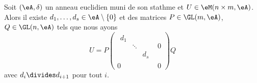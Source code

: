 \begin{proposition}   \label{PropPDfCqee}
	Soit \( (\eA,\delta)\) un anneau euclidien muni de son stathme  et \( U\in \eM(n \times m,\eA)\). Alors il existe \( d_1,\ldots, d_s\in \eA\setminus\{ 0 \}\) et des matrices \( P\in\GL(m,\eA)\), \( Q\in \GL(n,\eA)\) tels que nous ayons
	\begin{equation}
		U=P \begin{pmatrix}
			\begin{matrix}
				d_1 &        &     \\
				    & \ddots &     \\
				    &        & d_s
			\end{matrix} & 0 \\
			0                           & 0
		\end{pmatrix}Q
	\end{equation}
	avec \( d_i\divides d_{i+1}\) pour tout \( i\).
\end{proposition}

